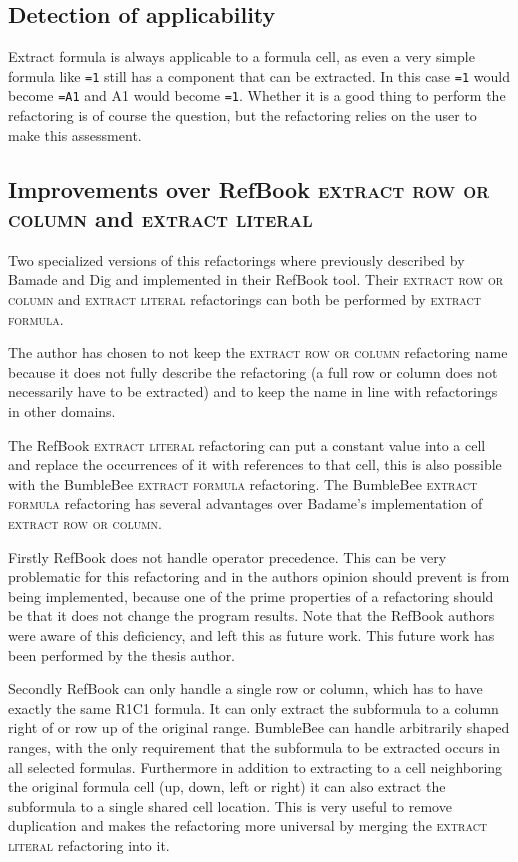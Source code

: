 \documentclass[12pt,a4paper,onecolumn,oneside,parskip]{memoir}
\newcommand{\f}[1]{\texttt{#1}}
\newcommand{\rf}[1]{\textsc{\lowercase{#1}}}
\begin{document}
\subsection{Detection of applicability}

Extract formula is always applicable to a formula cell, as even a very simple formula like \f{=1} still has a component that can be extracted.
In this case \f{=1} would become \f{=A1} and A1 would become \f{=1}.
Whether it is a good thing to perform the refactoring is of course the question, but the refactoring relies on the user to make this assessment.

\subsection{Improvements over RefBook \rf{Extract row or column} and \rf{Extract Literal}}
\label{subsubsec:improvementsextractformula}

Two specialized versions of this refactorings where previously described by Bamade and Dig \cite{badame2012refactoring} and implemented in their RefBook tool.
Their \rf{Extract Row or column} and \rf{Extract Literal} refactorings can both be performed by \rf{Extract formula}.

The author has chosen to not keep the \rf{extract row or column} refactoring name because it does not fully describe the refactoring (a full row or column does not necessarily have to be extracted) and to keep the name in line with refactorings in other domains.

The RefBook \rf{extract literal} refactoring can put a constant value into a cell and replace the occurrences of it with references to that cell, this is also possible with the BumbleBee \rf{extract formula} refactoring.
The BumbleBee \rf{Extract Formula} refactoring has several advantages over Badame's implementation of \rf{Extract row or column}.

Firstly RefBook does not handle operator precedence.
This can be very problematic for this refactoring and in the authors opinion should prevent is from being implemented, because one of the prime properties of a refactoring should be that it does not change the program results.
Note that the RefBook authors were aware of this deficiency, and left this as future work.
This future work has been performed by the thesis author.

Secondly RefBook can only handle a single row or column, which has to have exactly the same R1C1 formula. It can only extract the subformula to a column right of or row up of the original range.
BumbleBee can handle arbitrarily shaped ranges, with the only requirement that the subformula to be extracted occurs in all selected formulas.
Furthermore in addition to extracting to a cell neighboring the original formula cell (up, down, left or right) it can also extract the subformula to a single shared cell location.
This is very useful to remove duplication and makes the refactoring more universal by merging the \rf{extract literal} refactoring into it.
\end{document}
